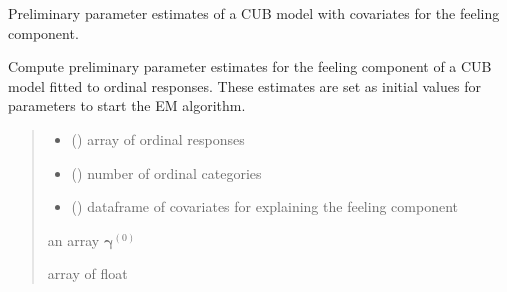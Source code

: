 \documentclass[letterpaper,10pt,english]{sphinxmanual}
\begin{document}

\begin{fulllineitems}
\label{\detokenize{cubmods:cubmods.cub_0w.init_gamma}}
\pysigstartsignatures
{}
\pysigstopsignatures
\sphinxAtStartPar
Preliminary parameter estimates of a CUB model with covariates for the feeling component.

\sphinxAtStartPar
Compute preliminary parameter estimates for the feeling component of a CUB model 
fitted to ordinal responses.
These estimates are set as initial values for parameters to start the E\sphinxhyphen{}M algorithm.
\begin{quote}\begin{description}
\begin{itemize}
\item {} 
\sphinxAtStartPar
{} () \textendash{} array of ordinal responses

\item {} 
\sphinxAtStartPar
{} () \textendash{} number of ordinal categories

\item {} 
\sphinxAtStartPar
{} () \textendash{} dataframe of covariates for explaining the feeling component

\end{itemize}

\sphinxAtStartPar
an array \(\pmb\gamma^{(0)}\)

\sphinxAtStartPar
array of float

\end{description}\end{quote}

\end{fulllineitems}

\end{document}
